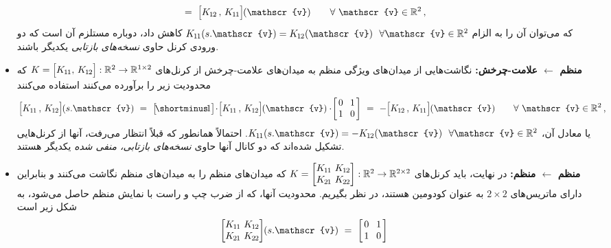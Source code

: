\begin{itemize}
\begin{align}
		\ =\ 
		\pig[\Kot \,,\, \Koo\pig] \mkern-1mu (\mathscr{v})
		\qquad \forall\ \mathscr{v} \in \R^2 \,,
	\end{align}
	که می‌توان آن را به الزام
	$\Koo(s.\mathscr{v}) = \Kot(\mathscr{v})\ \ \forall \mathscr{v} \in \R^2$ کاهش داد،
	دوباره مستلزم آن است که دو ورودی کرنل حاوی \emph{نسخه‌های بازتابی} یکدیگر باشند.
	\item[{\rule[2.0pt]{2pt}{2pt}}]
	\textbf{منظم $\leftarrow$ علامت-چرخش:}
	نگاشت‌هایی از میدان‌های ویژگی منظم به میدان‌های علامت-چرخش از کرنل‌های
	$K = \pig[\Koo,\, \Kot\pig]: \R^2 \to \R^{1\times2}$
	که محدودیت زیر را برآورده می‌کنند استفاده می‌کنند
	\begin{align}
		\pig[\Koo \,,\, \Kot\pig] \mkern-1mu (s.\mathscr{v})
		\ =\ 
		\big[\! \shortminus\!1 \big]
		\!\cdot\!
		\pig[\Koo \,,\, \Kot\pig] \mkern-1mu (\mathscr{v})
		\cdot\!
		\begin{bmatrix} \hspace{1.5pt} 0 &\mkern-4mu 1 \hspace*{1.5pt} \\ \hspace{1.5pt} 1 &\mkern-4mu 0 \hspace*{1.5pt} \end{bmatrix}
		\ =\ 
		- \pig[\Kot \,,\, \Koo\pig] \mkern-1mu (\mathscr{v})
		\qquad \forall\ \mathscr{v} \in \R^2 \,,
	\end{align}
	یا معادل آن، $\Koo(s.\mathscr{v}) = -\Kot(\mathscr{v})\ \ \forall \mathscr{v} \in \R^2$.
	احتمالاً همانطور که قبلاً انتظار می‌رفت، آنها از کرنل‌هایی تشکیل شده‌اند که دو کانال آنها حاوی \emph{نسخه‌های بازتابی، منفی شده} یکدیگر هستند.
	\item[{\rule[2.0pt]{2pt}{2pt}}]
	\textbf{منظم $\leftarrow$ منظم:}
	در نهایت، باید کرنل‌های
	$K = \begin{bmatrix} K_{\mkern-1mu 1 \mkern-1mu 1} &\mkern-12mu K_{\mkern-1mu 1 \mkern-1mu 2} \\ K_{\mkern-1mu 2 \mkern-1mu 1} &\mkern-12mu K_{\mkern-1mu 2 \mkern-1mu 2} \end{bmatrix}: \mathbb{R}^2 \to \mathbb{R}^{2\times2}$
	که میدان‌های منظم را به میدان‌های منظم نگاشت می‌کنند و بنابراین دارای ماتریس‌های $2\times2$ به عنوان کودومین هستند، در نظر بگیریم.
	محدودیت آنها، که از ضرب چپ و راست با نمایش منظم حاصل می‌شود، به شکل زیر است
	\begin{align}
		\begin{bmatrix} \Koo &\mkern-12mu \Kot \\ \Kto &\mkern-12mu \Ktt \end{bmatrix} \mkern-4mu (s.\mathscr{v})
		\ =\ 
		\begin{bmatrix} \hspace{1.5pt} 0 &\mkern-4mu 1 \hspace*{1.5pt} \\ \hspace{1.5pt} 1 &\mkern-4mu 0 \hspace*{1.5pt} \end{bmatrix}

\end{align}
\end{itemize}
